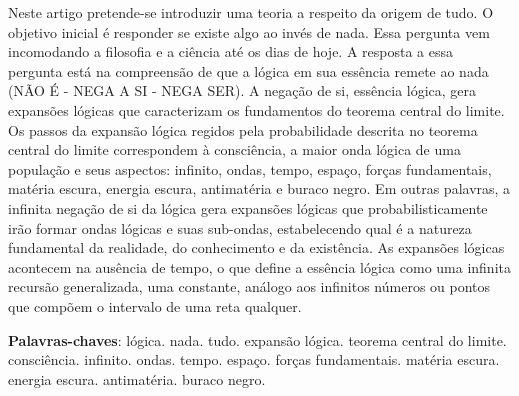 \setlength{\droptitle}{-50pt}
\maketitle
\vspace{-10mm}
\begin{resumoumacoluna}
	\vspace{-2mm}
	Neste artigo pretende-se introduzir uma teoria a respeito da origem de tudo. O objetivo inicial é responder se existe algo ao invés de nada. Essa pergunta vem incomodando a filosofia e a ciência até os dias de hoje. A resposta a essa pergunta está na compreensão de que a lógica em sua essência remete ao nada (NÃO É - NEGA A SI - NEGA SER). A negação de si, essência lógica, gera expansões lógicas que caracterizam os fundamentos do teorema central do limite. Os passos da expansão lógica regidos pela probabilidade descrita no teorema central do limite correspondem à consciência, a maior onda lógica de uma população e seus aspectos: infinito, ondas, tempo, espaço, forças fundamentais, matéria escura, energia escura, antimatéria e buraco negro. Em outras palavras, a infinita negação de si da lógica gera expansões lógicas que probabilisticamente irão formar ondas lógicas e suas sub-ondas, estabelecendo qual é a natureza fundamental da realidade, do conhecimento e da existência. As expansões lógicas acontecem na ausência de tempo, o que define a essência lógica como uma infinita recursão generalizada, uma constante, análogo aos infinitos números ou pontos que compõem o intervalo de uma reta qualquer.
 	
 	\noindent
	\textbf{Palavras-chaves}: lógica. nada. tudo. expansão lógica. teorema central do limite. consciência. infinito. ondas. tempo. espaço. forças fundamentais. matéria escura. energia escura. antimatéria. buraco negro.
\end{resumoumacoluna}

